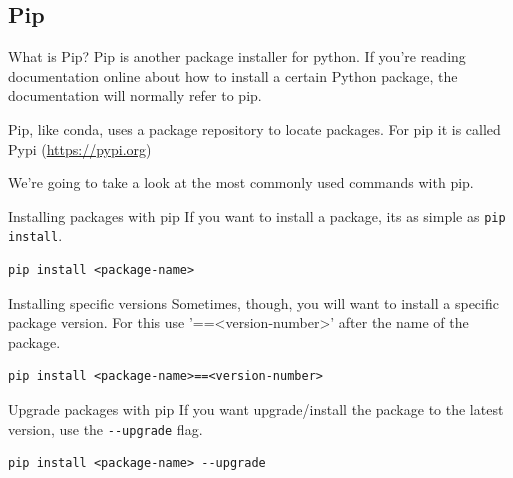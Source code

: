 \documentclass[10pt]{beamer}
\begin{document}
\subsection{Pip}
\label{sec:orgff1a55f}

\begin{frame}[label={sec:org4534c19}]{What is Pip?}
Pip is another package installer for python. If you're reading documentation online
about how to install a certain Python package, the documentation will normally refer
to pip.

Pip, like conda, uses a package repository to locate packages. For pip it is called
Pypi (\url{https://pypi.org})

We're going to take a look at the most commonly used commands with pip.
\end{frame}

\begin{frame}[label={sec:org604199a},fragile]{Installing packages with pip}
 If you want to install a package, its as simple as \texttt{pip install}.

\begin{verbatim}
pip install <package-name>
\end{verbatim}
\end{frame}

\begin{frame}[label={sec:orge0e27d6},fragile]{Installing specific versions}
 Sometimes, though, you will want to install a specific package version. For this use
'==<version-number>' after the name of the package.

\begin{verbatim}
pip install <package-name>==<version-number>
\end{verbatim}
\end{frame}

\begin{frame}[label={sec:org2c7e4e3},fragile]{Upgrade packages with pip}
 If you want upgrade/install the package to the latest version, use the \texttt{-{}-upgrade} flag.

\begin{verbatim}
pip install <package-name> --upgrade
\end{verbatim}
\end{frame}
\end{document}
